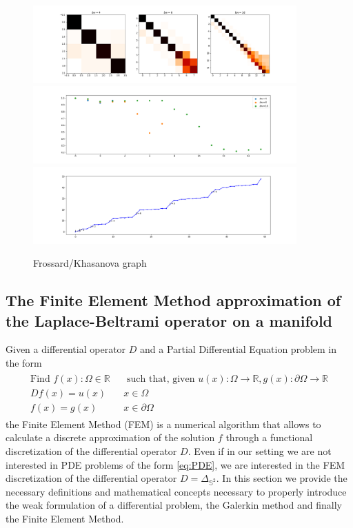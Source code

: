 \begin{figure}[h!]
	\centering
	\includegraphics[width=0.9\textwidth]{../codes/02.HeatKernelGraphLaplacian/equiangular/equi_Khasanova_Frossard_full.png}
	\includegraphics[width=0.9\textwidth]{../codes/02.HeatKernelGraphLaplacian/equiangular/equi_Khasanova_Frossard_full_diagonal.png}
	\includegraphics[width=0.9\textwidth]{../codes/02.HeatKernelGraphLaplacian/equiangular/equi_full_Khasanova_Frossard_eigenvalues_16.png}
	\caption{\label{fig:Frossard/Khasanova graph}Frossard/Khasanova graph}
\end{figure}

\subsection{The Finite Element Method approximation of the Laplace-Beltrami operator on a manifold}\label{sec:Chapter3: Using the Finite Element Method to approximate the Laplace-Beltrami operator on a manifold}
Given a differential operator $D$ and a Partial Differential Equation problem in the form
\begin{align}\label{eq:PDE}
\begin{split}
\text{Find } f(x):\Omega\in\mathbb R &\text{ such that, given }u(x):\Omega\to\mathbb R, g(x):\partial\Omega\to\mathbb R\\
Df(x)=u(x)\quad&x\in\Omega\\
f(x)=g(x)\quad &x\in\partial\Omega
\end{split}
\end{align}
the Finite Element Method (FEM) is a numerical algorithm that allows to calculate a discrete approximation of the solution $f$ through a functional discretization of the differential operator $D$. Even if in our setting we are not interested in PDE problems of the form \ref{eq:PDE}, we are interested in the FEM discretization of the differential operator $D=\Delta_{\mathbb S^2}$. In this section we provide the necessary definitions and mathematical concepts necessary to properly introduce the weak formulation of a differential problem, the Galerkin method and finally the Finite Element Method.\\
